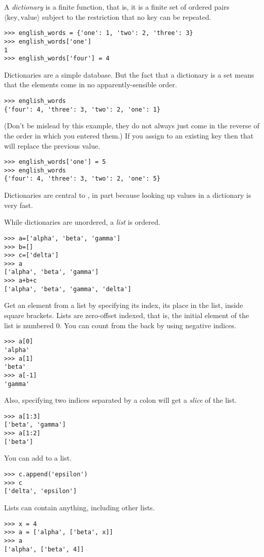 A \python{} \textit{dictionary} is a finite function, that is, it is a finite
set of ordered pairs $\langle\text{key},\text{value}\rangle$ subject 
to the restriction that no key can be repeated.
\begin{lstlisting}[style=python]
>>> english_words = {'one': 1, 'two': 2, 'three': 3}
>>> english_words['one']
1
>>> english_words['four'] = 4  
\end{lstlisting}
Dictionaries are a simple database.
But the fact that a dictionary is a set means that the elements come in 
no apparently-sensible order.
\begin{lstlisting}[style=python]
>>> english_words
{'four': 4, 'three': 3, 'two': 2, 'one': 1}
\end{lstlisting}
(Don't be mislead by this example, 
they do not always just come in the reverse of the order
in which you entered them.)
If you assign to an existing key then that will replace the previous value. 
\begin{lstlisting}[style=python]
>>> english_words['one'] = 5
>>> english_words
{'four': 4, 'three': 3, 'two': 2, 'one': 5}
\end{lstlisting}
Dictionaries are central to \python, in part because looking up values 
in a dictionary is very fast.

While dictionaries are unordered, a \python{} \textit{list} is ordered.
\begin{lstlisting}[style=python]
>>> a=['alpha', 'beta', 'gamma']
>>> b=[]
>>> c=['delta']
>>> a
['alpha', 'beta', 'gamma']
>>> a+b+c
['alpha', 'beta', 'gamma', 'delta']
\end{lstlisting}
Get an element from a list by specifying its index, its place in the list,
inside square brackets.
Lists are zero-offset indexed, that is, the initial element of the
list is numbered $0$.
You can count from the back by using negative indices.
\begin{lstlisting}[style=python]
>>> a[0]
'alpha'
>>> a[1]
'beta'
>>> a[-1]
'gamma'
\end{lstlisting}
Also, specifying two indices separated by a colon will get a \textit{slice} 
of the list. 
\begin{lstlisting}[style=python]
>>> a[1:3]
['beta', 'gamma']
>>> a[1:2]
['beta']
\end{lstlisting}
You can add to a list.
\begin{lstlisting}[style=python]
>>> c.append('epsilon')
>>> c
['delta', 'epsilon']  
\end{lstlisting}
Lists can contain anything, including other lists.
\begin{lstlisting}
>>> x = 4
>>> a = ['alpha', ['beta', x]]
>>> a
['alpha', ['beta', 4]]  
\end{lstlisting}

